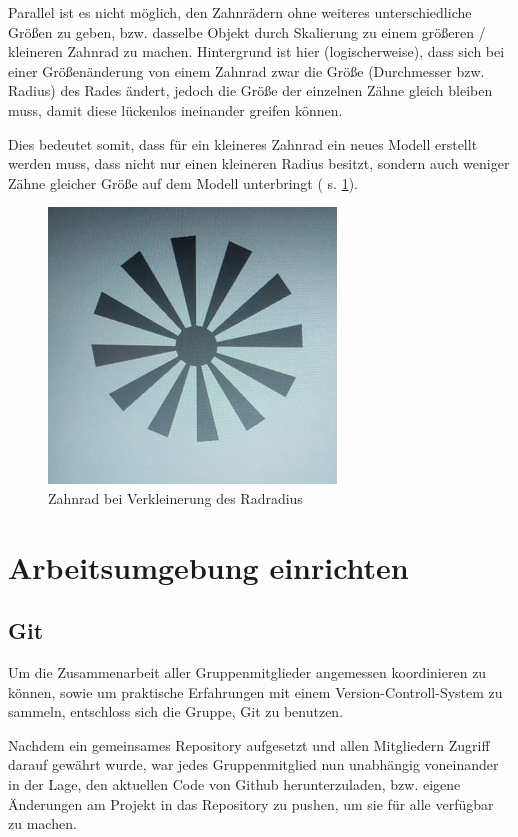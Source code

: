 \documentclass{article}
\begin{document}
Parallel ist es nicht möglich, den Zahnrädern ohne weiteres unterschiedliche Größen zu geben, bzw. dasselbe Objekt durch Skalierung zu einem größeren / kleineren Zahnrad zu machen. 
Hintergrund ist hier (logischerweise), dass sich bei einer Größenänderung von einem Zahnrad zwar die Größe (Durchmesser bzw. Radius) des Rades ändert, jedoch die Größe der einzelnen Zähne gleich bleiben muss, damit diese lückenlos ineinander greifen können. 

Dies bedeutet somit, dass für ein kleineres Zahnrad ein neues Modell erstellt werden muss, dass nicht nur einen kleineren Radius besitzt, sondern auch weniger Zähne gleicher Größe auf dem Modell unterbringt ( s. \ref{fig:littleGear}). 

\begin{figure}
\centering
\includegraphics[scale=1.7]{Little_Gear}
\caption{Zahnrad bei Verkleinerung des Radradius}
\label{fig:littleGear}
\end{figure}



\section{Arbeitsumgebung einrichten}



\subsection{Git}
Um die Zusammenarbeit aller Gruppenmitglieder angemessen koordinieren zu können, sowie um praktische Erfahrungen mit einem Version-Controll-System zu sammeln, entschloss sich die Gruppe, Git zu benutzen. 

Nachdem ein gemeinsames Repository aufgesetzt und allen Mitgliedern Zugriff darauf gewährt wurde, war jedes Gruppenmitglied nun unabhängig voneinander in der Lage, den aktuellen Code von Github herunterzuladen, bzw. eigene Änderungen am Projekt in das Repository zu pushen, um sie für alle verfügbar zu machen. 
\end{document}
